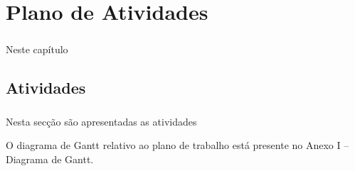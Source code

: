 \chapter*{\thechapter \quad Plano de Atividades}
\paragraph{}
Neste capítulo

\section{Atividades}
\paragraph{}
Nesta secção são apresentadas as atividades 

O diagrama de Gantt relativo ao plano de trabalho está presente no Anexo I – Diagrama de Gantt.

